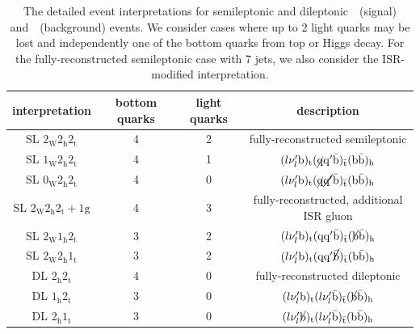 \begin{table}[h!]
\begin{center}
\caption{The detailed event interpretations for semileptonic and dileptonic~\ttH~(signal) and~\ttbb~(background) events. We consider cases where up to 2 light quarks may be lost and independently one of the bottom quarks from top or Higgs decay. For the fully-reconstructed semileptonic case with 7 jets, we also consider the ISR-modified interpretation.}
\label{tab:event_interpretation_list}
\begin{tabular}{c|ccc}
\hline
interpretation & bottom quarks & light quarks & description \\
\hline
SL $2_{\mathrm{W}} 2_{\mathrm{h}} 2_{\mathrm{t}}$ & 4 & 2 & fully-reconstructed semileptonic \\
SL $1_{\mathrm{W}} 2_{\mathrm{h}} 2_{\mathrm{t}}$ & 4 & 1 & $(l \nu_{l}' \mathrm{b})_{\mathrm{t}} (\cancel{\mathrm{q}} \mathrm{q}' \bar{\mathrm{b}})_{\bar{\mathrm{t}}} (\mathrm{b} \bar{\mathrm{b}})_{\mathrm{h}}$ \\
SL $0_{\mathrm{W}} 2_{\mathrm{h}} 2_{\mathrm{t}}$ & 4 & 0 & $(l \nu_{l}' \mathrm{b})_{\mathrm{t}} (\cancel{\mathrm{q}} \cancel{\mathrm{q}'} \bar{\mathrm{b}})_{\bar{\mathrm{t}}} (\mathrm{b} \bar{\mathrm{b}})_{\mathrm{h}}$ \\
SL $2_{\mathrm{W}} 2_{\mathrm{h}} 2_{\mathrm{t}}+1\mathrm{g}$ & 4 & 3 & fully-reconstructed, additional ISR gluon \\
SL $2_{\mathrm{W}} 1_{\mathrm{h}} 2_{\mathrm{t}}$ & 3 & 2 & $(l \nu_{l}' \mathrm{b})_{\mathrm{t}} (\mathrm{q} \mathrm{q}' \bar{\mathrm{b}})_{\bar{\mathrm{t}}} (\cancel{\mathrm{b}} \bar{\mathrm{b}})_{\mathrm{h}}$ \\
SL $2_{\mathrm{W}} 2_{\mathrm{h}} 1_{\mathrm{t}}$ & 3 & 2 & $(l \nu_{l}' \mathrm{b})_{\mathrm{t}} (\mathrm{q} \mathrm{q}' \cancel{\bar{\mathrm{b}}})_{\bar{\mathrm{t}}} (\mathrm{b} \bar{\mathrm{b}})_{\mathrm{h}}$ \\
\hline
DL $2_{\mathrm{h}} 2_{\mathrm{t}}$ & 4 & 0 & fully-reconstructed dileptonic \\
DL $1_{\mathrm{h}} 2_{\mathrm{t}}$ & 3 & 0 & $(l \nu_{l}' \mathrm{b})_{\mathrm{t}} (l \nu_{l}' \bar{\mathrm{b}})_{\bar{\mathrm{t}}} (\cancel{\mathrm{b}} \bar{\mathrm{b}})_{\mathrm{h}}$ \\
DL $2_{\mathrm{h}} 1_{\mathrm{t}}$ & 3 & 0 & $(l \nu_{l}' \cancel{\mathrm{b}})_{\mathrm{t}} (l \nu_{l}' \bar{\mathrm{b}})_{\bar{\mathrm{t}}} (\mathrm{b} \bar{\mathrm{b}})_{\mathrm{h}}$ \\
\hline
\hline
\end{tabular}
\end{center}
\end{table}

